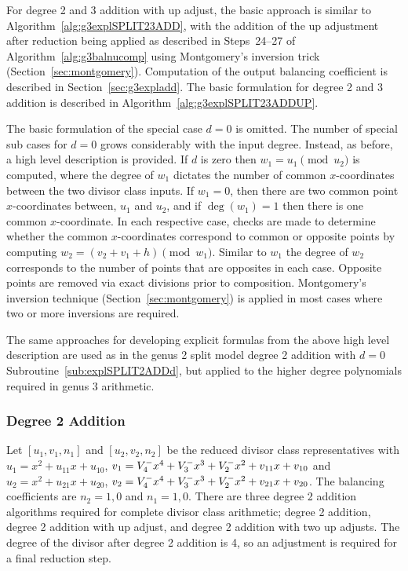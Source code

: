 For degree 2 and 3 addition with up adjust, the basic approach is similar to
Algorithm~\ref{alg:g3explSPLIT23ADD}, with the addition of the up adjustment
after reduction being applied as described in Steps~24--27 of
Algorithm~\ref{alg:g3balnucomp} using Montgomery's inversion trick
(Section~\ref{sec:montgomery}).  Computation of the output balancing coefficient
is described in Section~\ref{sec:g3expladd}. The basic formulation for degree 2
and 3 addition is described in Algorithm~\ref{alg:g3explSPLIT23ADDUP}.

The basic formulation of the special case $d = 0$ is omitted. The number of
special sub cases for $d=0$ grows considerably with the input degree. Instead,
as before, a high level description is provided. If $d$ is zero then $w_1 = u_1
\pmod {u_2}$ is computed, where the degree of $w_1$ dictates the number of
common $x$-coordinates between the two divisor class inputs. If $w_1=0$, then
there are two common point $x$-coordinates between, $u_1$ and $u_2$, and if
$\deg(w_1) = 1$ then there is one common $x$-coordinate. In each respective
case, checks are made to determine whether the common $x$-coordinates correspond
to common or opposite points by computing $w_2 = (v_2 + v_1 + h) \pmod{w_1}$.
Similar to $w_1$ the degree of $w_2$ corresponds to the number of points that
are opposites in each case. Opposite points are removed via exact divisions
prior to composition. Montgomery's inversion technique
(Section~\ref{sec:montgomery}) is applied in most cases where two or more
inversions are required. 

The same approaches for developing explicit formulas from the above high level
description are used as in the genus 2 split model degree 2 addition with $d=0$
Subroutine~\ref{sub:explSPLIT2ADDd}, but applied to the higher degree
polynomials required in genus 3 arithmetic.


\subsubsection{Degree 2 Addition}
Let $[u_1,v_1,n_1]$ and $[u_2,v_2,n_2]$ be the reduced divisor class representatives
with $u_1 = x^2 + u_{11}x + u_{10}$, $v_1 = V^{-}_4x^4 + V^{-}_3x^3 + V^{-}_2x^2
+ v_{11}x + v_{10}$ and $u_2 = x^2 + u_{21}x + u_{20}$, $v_2 = V^{-}_4x^4 +
V^{-}_3x^3 + V^{-}_2x^2 + v_{21}x + v_{20}$. The balancing coefficients are $n_2 = 1,0$ and
$n_1 = 1,0$. There are three degree 2 addition algorithms required for complete
divisor class arithmetic; degree 2 addition, degree 2 addition with up adjust,
and degree 2 addition with two up adjusts.  The degree of the divisor after
degree 2 addition is 4, so an adjustment is required for a final reduction step.

